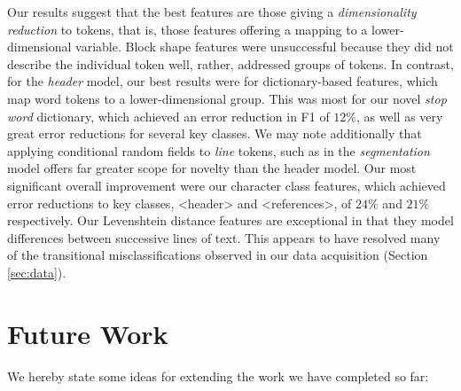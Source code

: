 Our results suggest that the best features are those giving a \emph{dimensionality reduction} to tokens, that is, those features offering a mapping to a lower-dimensional variable. Block shape features were unsuccessful because they did not describe the individual token well, rather, addressed groups of tokens. In contrast, for the \emph{header} model, our best results were for dictionary-based features, which map word tokens to a lower-dimensional group. This was most  for our novel \emph{stop word} dictionary, which achieved an error reduction in F1 of $12\%$, as well as very great error reductions for several key classes. We may note additionally that applying conditional random fields to \emph{line} tokens, such as in the \emph{segmentation} model offers far greater scope for novelty than the header model. Our most significant overall improvement were our character class features, which achieved error reductions to key classes, <header> and <references>, of $24\%$ and $21\%$ respectively. Our Levenshtein distance features are exceptional in that they model differences between successive lines of text. This appears to have resolved many of the transitional misclassifications observed in our data acquisition (Section \ref{sec:data}).

\section{Future Work}
\label{sec:futurework}

We hereby state some ideas for extending the work we have completed so far:

